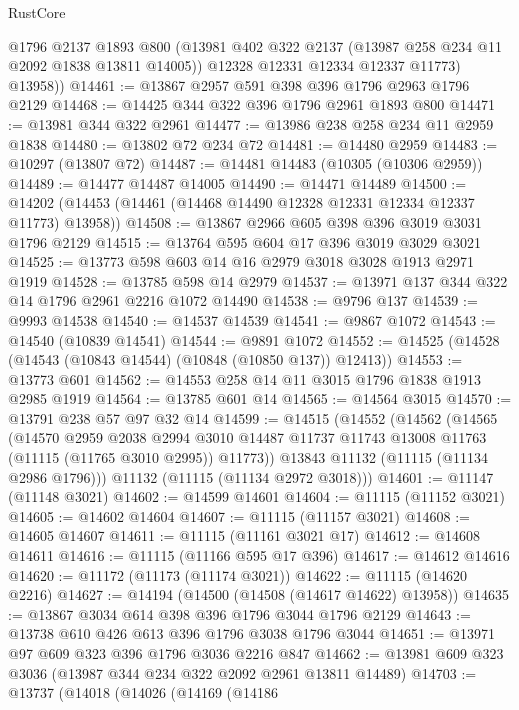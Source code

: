 \begin{lexlean}{RustCore}
\begin{coremodule}
          @1796
          @2137
          @1893
          @800
          (@13981 @402 @322 @2137 (@13987 @258 @234 @11 @2092 @1838 @13811 @14005))
          @12328
          @12331
          @12334
          @12337
          @11773)
        @13958))
@14461 := @13867 @2957 @591 @398 @396 @1796 @2963 @1796 @2129
@14468 := @14425 @344 @322 @396 @1796 @2961 @1893 @800
@14471 := @13981 @344 @322 @2961
@14477 := @13986 @238 @258 @234 @11 @2959 @1838
@14480 := @13802 @72 @234 @72
@14481 := @14480 @2959
@14483 := @10297 (@13807 @72)
@14487 := @14481 @14483 (@10305 (@10306 @2959))
@14489 := @14477 @14487 @14005
@14490 := @14471 @14489
@14500 := @14202 (@14453 (@14461 (@14468 @14490 @12328 @12331 @12334 @12337 @11773) @13958))
@14508 := @13867 @2966 @605 @398 @396 @3019 @3031 @1796 @2129
@14515 := @13764 @595 @604 @17 @396 @3019 @3029 @3021
@14525 := @13773 @598 @603 @14 @16 @2979 @3018 @3028 @1913 @2971 @1919
@14528 := @13785 @598 @14 @2979
@14537 := @13971 @137 @344 @322 @14 @1796 @2961 @2216 @1072 @14490
@14538 := @9796 @137
@14539 := @9993 @14538
@14540 := @14537 @14539
@14541 := @9867 @1072
@14543 := @14540 (@10839 @14541)
@14544 := @9891 @1072
@14552 := @14525 (@14528 (@14543 (@10843 @14544) (@10848 (@10850 @137)) @12413))
@14553 := @13773 @601
@14562 := @14553 @258 @14 @11 @3015 @1796 @1838 @1913 @2985 @1919
@14564 := @13785 @601 @14
@14565 := @14564 @3015
@14570 := @13791 @238 @57 @97 @32 @14
@14599 := @14515
    (@14552
      (@14562
        (@14565
          (@14570
            @2959
            @2038
            @2994
            @3010
            @14487
            @11737
            @11743
            @13008
            @11763
            (@11115 (@11765 @3010 @2995))
            @11773))
        @13843
        @11132
        (@11115 (@11134 @2986 @1796)))
      @11132
      (@11115 (@11134 @2972 @3018)))
@14601 := @11147 (@11148 @3021)
@14602 := @14599 @14601
@14604 := @11115 (@11152 @3021)
@14605 := @14602 @14604
@14607 := @11115 (@11157 @3021)
@14608 := @14605 @14607
@14611 := @11115 (@11161 @3021 @17)
@14612 := @14608 @14611
@14616 := @11115 (@11166 @595 @17 @396)
@14617 := @14612 @14616
@14620 := @11172 (@11173 (@11174 @3021))
@14622 := @11115 (@14620 @2216)
@14627 := @14194 (@14500 (@14508 (@14617 @14622) @13958))
@14635 := @13867 @3034 @614 @398 @396 @1796 @3044 @1796 @2129
@14643 := @13738 @610 @426 @613 @396 @1796 @3038 @1796 @3044
@14651 := @13971 @97 @609 @323 @396 @1796 @3036 @2216 @847
@14662 := @13981 @609 @323 @3036 (@13987 @344 @234 @322 @2092 @2961 @13811 @14489)
@14703 := @13737
    (@14018
      (@14026
        (@14169
          (@14186

\end{coremodule}
\end{lexlean}
